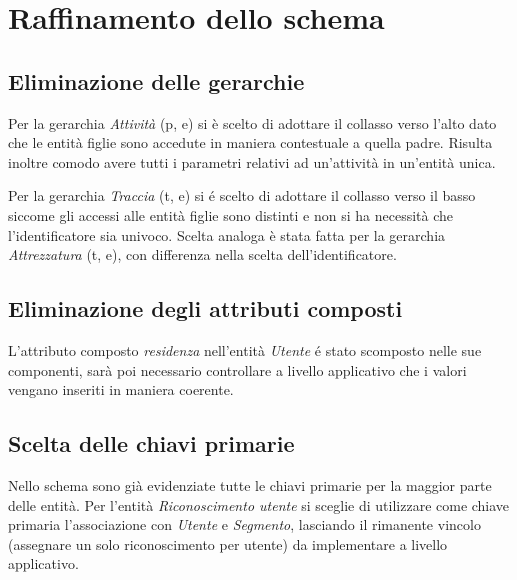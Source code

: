 \documentclass[12pt]{report}
\begin{document}
\newpage
\section{Raffinamento dello schema}

\subsection*{Eliminazione delle gerarchie}

Per la gerarchia \emph{Attività} (p, e) si è scelto di adottare il collasso verso l'alto dato che le
entità figlie sono accedute in maniera contestuale a quella padre. Risulta inoltre comodo avere
tutti i parametri relativi ad un'attività in un'entità unica. 

Per la gerarchia \emph{Traccia} (t, e) si é scelto di adottare il collasso verso il basso siccome gli
accessi alle entità figlie sono distinti e non si ha necessità che l'identificatore sia univoco.
Scelta analoga è stata fatta per la gerarchia \emph{Attrezzatura} (t, e), con differenza nella scelta
dell'identificatore.

\subsection*{Eliminazione degli attributi composti}

L'attributo composto \emph{residenza} nell'entità \emph{Utente} é stato scomposto nelle sue 
componenti, sarà poi necessario controllare a livello applicativo che i valori 
vengano inseriti in maniera coerente.

\subsection*{Scelta delle chiavi primarie}

Nello schema sono già evidenziate tutte le chiavi primarie per la maggior
parte delle entità. Per l'entità \emph{Riconoscimento utente} si sceglie di utilizzare come chiave
primaria l'associazione con \emph{Utente} e \emph{Segmento}, lasciando il rimanente vincolo (assegnare
un solo riconoscimento per utente) da implementare a livello applicativo.
\end{document}
